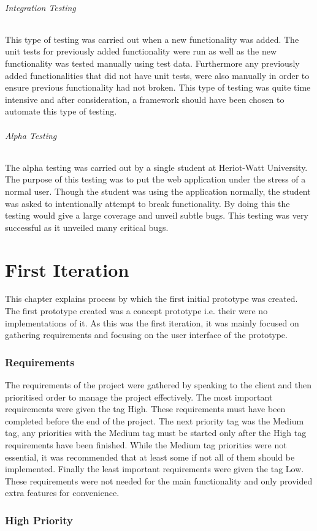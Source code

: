 \documentclass[a4paper,oneside,11pt]{report}
\begin{document}
\subparagraph{Integration Testing}
This type of testing was carried out when a new functionality was added. The unit tests for previously added functionality were run as well as the new functionality was tested manually using test data. Furthermore any previously added functionalities that did not have unit tests, were also manually in order to ensure previous functionality had not broken. This type of testing was quite time intensive and after consideration, a framework should have been chosen to automate this type of testing.

\subparagraph{Alpha Testing}
The alpha testing was carried out by a single student at Heriot-Watt University. The purpose of this testing was to put the web application under the stress of a normal user. Though the student was using the application normally, the student was asked to intentionally attempt to break functionality. By doing this the testing would give a large coverage and unveil subtle bugs. This testing was very successful as it unveiled many critical bugs.

\chapter{First Iteration}
This chapter explains process by which the first initial prototype was created. The first prototype created was a concept prototype i.e. their were no implementations of it. As this was the first iteration, it was mainly focused on gathering requirements and focusing on the user interface of the prototype.

\subsection{Requirements}
The requirements of the project were gathered by speaking to the client and then prioritised order to manage the project effectively. The most important requirements were given the tag High. These requirements must have been completed before the end of the project. The next priority tag was the Medium tag, any priorities with the Medium tag must be started only after the High tag requirements have been finished. While the Medium tag priorities were not essential, it was recommended that at least some if not all of them should be implemented. Finally the least important requirements were given the tag Low. These requirements were not needed for the main functionality and only provided extra features for convenience.

\subsection{High Priority}
\end{document}
